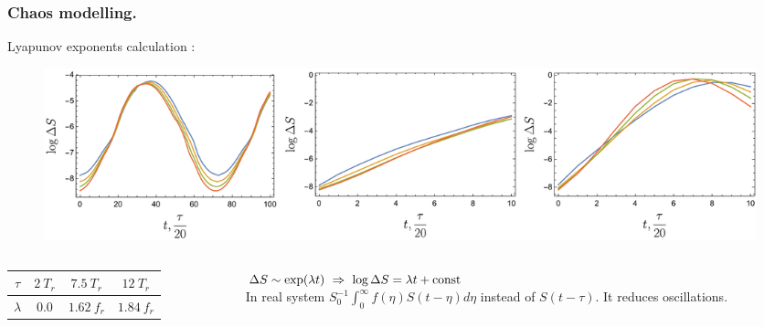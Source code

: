 \begin{frame}
	\frametitle{Chaos modelling.}
	Lyapunov exponents calculation :
	
	\begin{figure}
		\centering
		\includegraphics[width=\linewidth]{figures/lyapunovs.pdf}
	\end{figure}

\begin{columns}
	\begin{column}{0.4\linewidth}
		\begin{tabular}{c|c|c|c}
		$\tau$ & $2 \ T_r$ & $7.5 \ T_r$ & $12 \ T_r$	\\ \hline
		$\lambda$ & $0.0$ & $1.62 \ f_r$ & $1.84 \ f_r$
		\end{tabular}	
	\end{column}
	\begin{column}{0.6\linewidth}
		
		$\Delta S \sim \exp(\lambda t) \ \Rightarrow \ \log \Delta S = \lambda t + \const$\\[5pt]
		In real system $S_0^{-1} \int_{0}^{\infty} f(\eta) S(t-\eta)d\eta$ instead of $S(t-\tau)$. It reduces oscillations.
	\end{column}
\end{columns}	
\begin{center}
\end{center}
\end{frame}	
